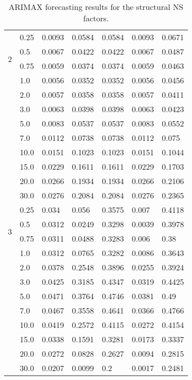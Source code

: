 \begin{table}[htbp]
\begin{tabular}{|l|l|l|l|l|l|l|}
\multirow{4}{*}{2}&0.25&0.0093&0.0584&0.0584&0.0093&0.0671\\ \cline{2-7}
&0.5&0.0067&0.0422&0.0422&0.0067&0.0487\\ \cline{2-7}
&0.75&0.0059&0.0374&0.0374&0.0059&0.0463\\ \cline{2-7}
&1.0&0.0056&0.0352&0.0352&0.0056&0.0456\\ \cline{2-7}
&2.0&0.0057&0.0358&0.0358&0.0057&0.0411\\ \cline{2-7}
&3.0&0.0063&0.0398&0.0398&0.0063&0.0423\\ \cline{2-7}
&5.0&0.0083&0.0537&0.0537&0.0083&0.0552\\ \cline{2-7}
&7.0&0.0112&0.0738&0.0738&0.0112&0.075\\ \cline{2-7}
&10.0&0.0151&0.1023&0.1023&0.0151&0.1044\\ \cline{2-7}
&15.0&0.0229&0.1611&0.1611&0.0229&0.1703\\ \cline{2-7}
&20.0&0.0266&0.1934&0.1934&0.0266&0.2106\\ \cline{2-7}
&30.0&0.0276&0.2084&0.2084&0.0276&0.2365\\ \cline{2-7}
\multirow{4}{*}{3}&0.25&0.034&0.056&0.3575&0.007&0.4118\\ \cline{2-7}
&0.5&0.0312&0.0249&0.3298&0.0039&0.3978\\ \cline{2-7}
&0.75&0.0311&0.0488&0.3283&0.006&0.38\\ \cline{2-7}
&1.0&0.0312&0.0765&0.3282&0.0086&0.3643\\ \cline{2-7}
&2.0&0.0378&0.2548&0.3896&0.0255&0.3924\\ \cline{2-7}
&3.0&0.0425&0.3185&0.4347&0.0319&0.4425\\ \cline{2-7}
&5.0&0.0471&0.3764&0.4746&0.0381&0.49\\ \cline{2-7}
&7.0&0.0467&0.3558&0.4641&0.0366&0.4766\\ \cline{2-7}
&10.0&0.0419&0.2572&0.4115&0.0272&0.4154\\ \cline{2-7}
&15.0&0.0338&0.1591&0.3281&0.0173&0.3337\\ \cline{2-7}
&20.0&0.0272&0.0828&0.2627&0.0094&0.2815\\ \cline{2-7}
&30.0&0.0207&0.0099&0.2&0.0017&0.2481\\ \cline{2-7}

            \end{tabular}
            \caption{ARIMAX forecasting results for the structural NS factors.}
            \label{tab:structuralARIMAX}
        \end{table}
